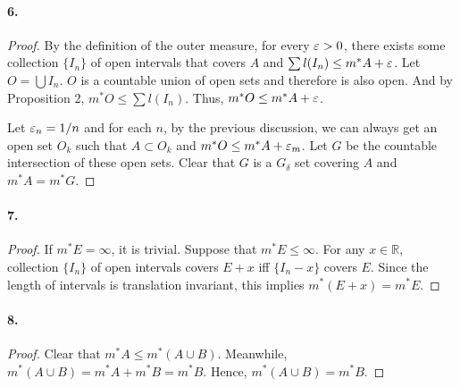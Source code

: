   \paragraph{6.}
  \begin{proof}
    By the definition of the outer measure, for every $\varepsilon > 0$, there exists 
    some collection $\{I_n\}$ of open intervals that covers $A$ and $\sum l(I_n)
    \le m^*A+\varepsilon$. Let $O=\bigcup I_n$. $O$ is a countable union of open sets 
    and therefore is also open. And by Proposition 2, $m^*O\le \sum l(I_n)$. 
    Thus, $m^*O\le m^*A+\varepsilon$. \par
    Let $\varepsilon_n = 1/n$ and for each $n$, by the previous discussion, we can 
    always get an open set $O_k$ such that $A\subset O_k$ and $m^*O\le m^*A+
    \varepsilon_m$. Let $G$ be the countable intersection of these open sets. Clear 
    that $G$ is a $G_\delta$ set covering $A$ and $m^*A=m^*G$.
  \end{proof}

  \paragraph{7.}
  \begin{proof}
    If $m^*E=\infty$, it is trivial. Suppose that $m^*E\le\infty$. For any $x\in
    \mathbb{R}$, collection $\{I_n\}$ of open intervals covers $E+x$ iff $\{I_n
    -x\}$ covers $E$. Since the length of intervals is translation invariant, 
    this implies $m^*(E+x)=m^*E$.
  \end{proof}

  \paragraph{8.}
  \begin{proof}
    Clear that $m^*A\le m^*(A\cup B)$. Meanwhile, $m^*(A\cup B) = m^*A + m^*B =
    m^*B$. Hence, $m^*(A\cup B)=m^*B$.
  \end{proof}
